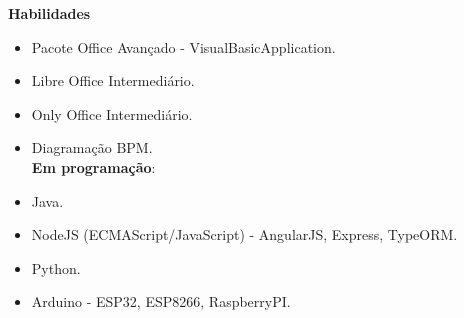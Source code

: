 \documentclass[12pt,a4paper,oneside,sumario=tradicional,brazil]{abntex2}
\begin{document}
\begin{center}
	\textbf{{\Large Habilidades}} \\
\end{center}
\begin{itemize}
	\item Pacote Office Avançado - VisualBasicApplication. \\
	\vspace{-1cm}
	\item Libre Office Intermediário. \\
	\vspace{-1cm}
	\item Only Office Intermediário. \\
	\vspace{-1cm}
	\item Diagramação BPM. \\
	\textbf{Em programação}: \\
	\vspace{-1cm}
	\item Java. \\
	\vspace{-1cm}
	\item NodeJS (ECMAScript/JavaScript) - AngularJS, Express, TypeORM. \\
	\vspace{-1cm}
	\item Python. \\
	\vspace{-1cm}
	\item Arduino - ESP32, ESP8266, RaspberryPI. \\

\end{itemize}

%

\end{document}
